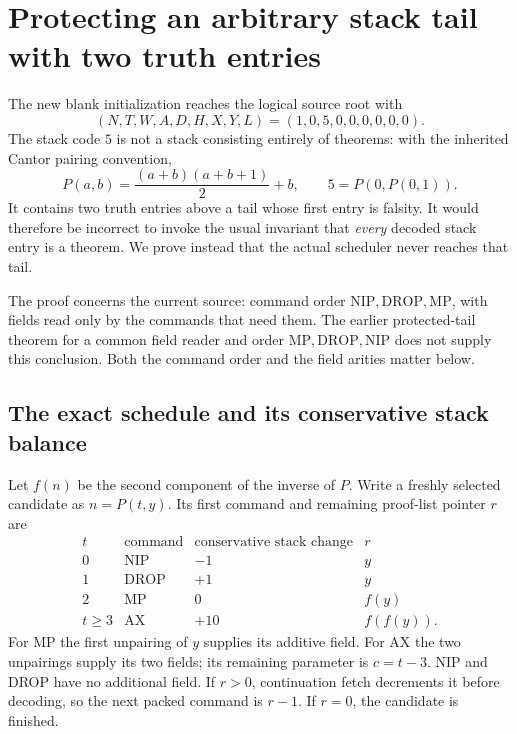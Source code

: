 \section{Protecting an arbitrary stack tail with two truth entries}
\label{sec:two-truth-tail}

The new blank initialization reaches the logical source root with
\[
 (N,T,W,A,D,H,X,Y,L)=(1,0,5,0,0,0,0,0,0).
\]
The stack code $5$ is not a stack consisting entirely of theorems:
with the inherited Cantor pairing convention,
\begin{equation}
 P(a,b)=\frac{(a+b)(a+b+1)}2+b,\qquad
 5=P(0,P(0,1)).
 \label{eq:tail-five}
\end{equation}
It contains two truth entries above a tail whose first entry is falsity.
It would therefore be incorrect to invoke the usual invariant that
\emph{every} decoded stack entry is a theorem. We prove instead that the
actual scheduler never reaches that tail.

The proof concerns the current source: command order
$\mathrm{NIP},\mathrm{DROP},\mathrm{MP}$, with fields read only by the
commands that need them. The earlier protected-tail theorem for a common
field reader and order $\mathrm{MP},\mathrm{DROP},\mathrm{NIP}$ does not
supply this conclusion. Both the command order and the field arities
matter below.

\subsection{The exact schedule and its conservative stack balance}

Let $f(n)$ be the second component of the inverse of $P$.
Write a freshly selected candidate as $n=P(t,y)$.
Its first command and remaining proof-list pointer $r$ are
\begin{equation}
\begin{array}{c|c|r|c}
 t&\text{command}&\text{conservative stack change}&r\\ \hline
 0&\mathrm{NIP}&-1&y\\
 1&\mathrm{DROP}&+1&y\\
 2&\mathrm{MP}&0&f(y)\\
 t\geq3&\mathrm{AX}&+10&f(f(y)).
\end{array}
\label{eq:tail-command-arities}
\end{equation}
For MP the first unpairing of $y$ supplies its additive field.
For AX the two unpairings supply its two fields; its remaining
parameter is $c=t-3$. NIP and DROP have no additional field.
If $r>0$, continuation fetch decrements it before decoding, so the next
packed command is $r-1$. If $r=0$, the candidate is finished.

